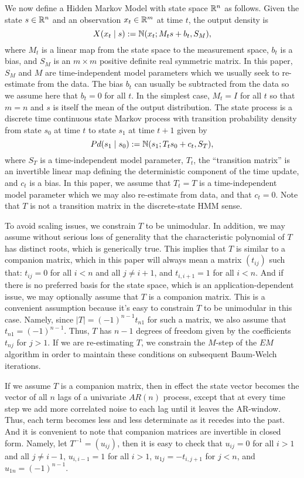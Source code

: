\documentclass[12pt,leqno]{article}
\begin{document}
We now define a Hidden Markov Model with state space ${\mathbb R}^n$ as follows.  Given the state $s\in{\mathbb R}^n$ and an observation $x_t\in{\mathbb R}^m$ at time $t$, the output density is
$$
X(x_t\mid s) := {\mathbb N}(x_t;M_ts + b_t,S_M),
$$
where $M_t$ is a linear map from the state space to the
measurement space, $b_t$ is a bias, and $S_M$ is an $m\times{m}$ positive definite real symmetric matrix.  In this paper, $S_M$ and $M$ are time-independent model parameters which we usually seek to re-estimate from the data.  The bias $b_t$ can
usually be 
subtracted from the data so we assume here that $b_t = 0$ for all $t$. 
In the simplest case, $M_t = I$ for all $t$ so that $m = n$ and $s$ is itself the mean of the output distribution.  
The state process is a discrete time continuous state Markov process with transition probability density
from state $s_0$ at time $t$ to state $s_1$ at time $t+1$ given by
$$
Pd(s_1\mid s_0) :=  {\mathbb N}(s_1;T_ts_0+c_t,S_T),
$$
where $S_T$ is a time-independent model parameter, $T_t$, the ``transition matrix'' is an invertible linear map  
defining the deterministic component of the time update, and $c_t$ is a bias.  In this paper, we assume that
$T_t = T$ is a time-independent model parameter which we may
also re-estimate from data, and that $c_t = 0$.  Note that $T$ is not a transition matrix in the
discrete-state HMM sense.

To avoid scaling issues, we constrain $T$ to be unimodular.  In addition,  we may assume without serious loss of generality
that the characteristic polynomial of $T$ has distinct roots, which is generically true.  This implies that $T$
is similar to a companion matrix, which in this paper will always mean a matrix $(t_{ij})$ such that:
$t_{ij} = 0$ for all $i < n$ and all $j \neq i+1$, and $t_{i,i+1} = 1$ for all $i < n$.  And if there is no
preferred basis for the state space, which is an application-dependent issue,
we may optionally assume that $T$ is a companion matrix.  This is a convenient assumption because it's easy to
constrain $T$ to be unimodular in this case.  Namely,
since $|T| = (-1)^{n-1}t_{n1}$ for such a matrix, we also assume that $t_{n1} = (-1)^{n-1}$.  Thus, $T$ has $n-1$
degrees of freedom given by the coefficients $t_{nj}$ for $j > 1$.  If we are re-estimating $T$, we constrain the $M$-step
of the $EM$ algorithm in order to maintain these conditions on subsequent Baum-Welch iterations.

If we assume $T$ is a companion matrix, then in effect the state vector becomes the vector of all $n$ lags of a
univariate $AR(n)$ process, except that at every time step we add more correlated noise to each lag until it leaves
the AR-window. Thus, each term becomes less and less determinate as it recedes into the past.
And it is convenient to note that companion matrices are invertible in closed form.  Namely, let $T^{-1} = (u_{ij})$, then
it is easy to check that $u_{ij} = 0$ for all $i > 1$ and all $j\neq i-1$,
$u_{i,i-1} = 1$ for all $i > 1$, $ u_{1j} = -t_{i,j+1}$ for $j < n$, and $u_{1n} = (-1)^{n-1}$.   
\end{document}

